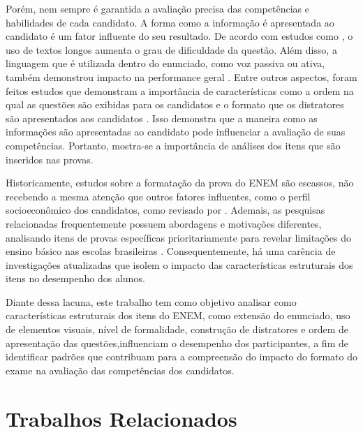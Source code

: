 \documentclass[a4paper,10pt, twocolumn]{article}
\begin{document}
Porém, nem sempre é garantida a avaliação precisa das competências e habilidades de cada candidato. A forma como a informação é apresentada ao candidato é um fator influente do seu resultado. De acordo com estudos como \textcite{Pullishery2020,2018,silva2019desempenho}, o uso de textos longos aumenta o grau de dificuldade da questão. Além disso, a linguagem que é utilizada dentro do enunciado, como voz passiva ou ativa, também demonstrou impacto na performance geral \cite{correia2004complexidade,Marcom2016}. Entre outros aspectos, foram feitos estudos que demonstram a importância de características como a ordem na qual as questões são exibidas para os candidatos \cite{Barichello2022,Anaya2023} e o formato que os distratores são apresentados aos candidatos \cite{Marcom2016,lopes2015estudo,Caldwell2013}. Isso demonstra que a maneira como as informações são apresentadas ao candidato pode influenciar a avaliação de suas competências. Portanto, mostra-se a importância de análises dos itens que são inseridos nas provas. 

Historicamente, estudos sobre a formatação da prova do ENEM são escassos, não recebendo a mesma atenção que outros fatores influentes, como o perfil socioeconômico dos candidatos, como revisado por \textcite{Dutra2023}. Ademais, as pesquisas relacionadas frequentemente possuem abordagens e motivações diferentes, analisando itens de provas específicas prioritariamente para revelar limitações do ensino básico nas escolas brasileiras \cite{Cestaro2020, lopes2015estudo}. Consequentemente, há uma carência de investigações atualizadas que isolem o impacto das características estruturais dos itens no desempenho dos alunos.

Diante dessa lacuna, este trabalho tem como objetivo analisar como características estruturais dos itens do ENEM, como extensão do enunciado, uso de elementos visuais, nível de formalidade, construção de distratores e ordem de apresentação das questões,influenciam o desempenho dos participantes, a fim de identificar padrões que contribuam para a compreensão do impacto do formato do exame na avaliação das competências dos candidatos.
 
\section{Trabalhos Relacionados}
\end{document}
